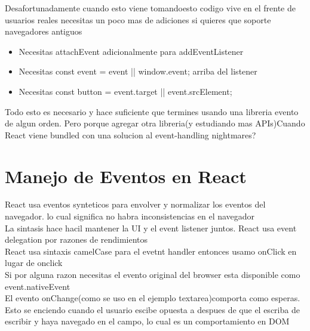 Desafortunadamente cuando esto viene tomandoesto codigo vive en el frente de usuarios reales necesitas un poco mas de adiciones si quieres que soporte navegadores antiguos
\begin{itemize}
  \item Necesitas attachEvent adicionalmente para addEventListener 
  \item Necesitas const event = event || window.event; arriba del listener
  \item Necesitas const button = event.target || event.srcElement;
\end{itemize}
Todo esto es necesario y hace suficiente que termines usando una libreria evento  de algun orden. Pero porque agregar otra libreria(y estudiando mas APIs)Cuando React viene bundled con una solucion al event-handling nightmares?
\section{Manejo de Eventos en React}
React usa eventos synteticos para envolver y normalizar los eventos del navegador. lo cual significa no habra inconsistencias en el navegador\\
La sintasis hace hacil mantener la UI y el event listener juntos. React usa event delegation por razones de rendimientos\\
React usa sintaxis camelCase para el evetnt handler entonces usamo onClick en lugar de onclick\\
Si por alguna razon necesitas el evento original del browser esta disponible como event.nativeEvent\\
El evento onChange(como se uso en el ejemplo textarea)comporta como esperas. Esto se enciendo cuando el usuario escibe opuesta a despues de que el escriba de escribir y haya navegado en el campo, lo cual es un comportamiento en DOM
